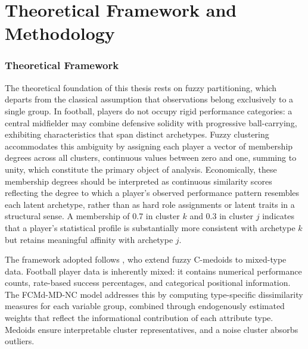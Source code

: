 \documentclass[a4paper,11pt]{report}
\begin{document}
\chapter{Theoretical Framework and Methodology}

\subsection{Theoretical Framework}

The theoretical foundation of this thesis rests on fuzzy partitioning, which departs from the classical assumption that observations belong exclusively to a single group. In football, players do not occupy rigid performance categories: a central midfielder may combine defensive solidity with progressive ball-carrying, exhibiting characteristics that span distinct archetypes. Fuzzy clustering accommodates this ambiguity by assigning each player a vector of membership degrees across all clusters, continuous values between zero and one, summing to unity, which constitute the primary object of analysis. Economically, these membership degrees should be interpreted as continuous similarity scores reflecting the degree to which a player's observed performance pattern resembles each latent archetype, rather than as hard role assignments or latent traits in a structural sense. A membership of 0.7 in cluster $k$ and 0.3 in cluster $j$ indicates that a player's statistical profile is substantially more consistent with archetype $k$ but retains meaningful affinity with archetype $j$.

The framework adopted follows \cite{durso2022robust}, who extend fuzzy C-medoids to mixed-type data. Football player data is inherently mixed: it contains numerical performance counts, rate-based success percentages, and categorical positional information. The FCMd-MD-NC model addresses this by computing type-specific dissimilarity measures for each variable group, combined through endogenously estimated weights that reflect the informational contribution of each attribute type. Medoids ensure interpretable cluster representatives, and a noise cluster absorbs outliers.
\end{document}
